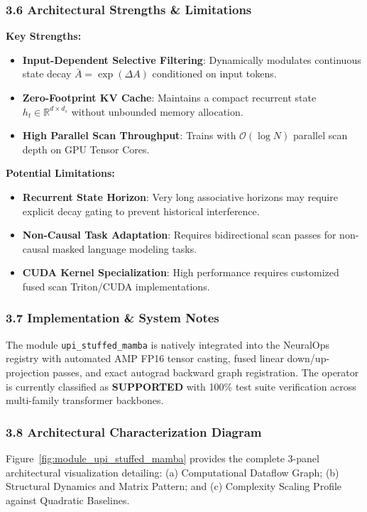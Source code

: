 \subsubsection*{3.6 Architectural Strengths \& Limitations}
\textbf{Key Strengths:}
\begin{itemize}
    \item \textbf{Input-Dependent Selective Filtering}: Dynamically modulates continuous state decay $\bar{A} = \exp(\Delta A)$ conditioned on input tokens.
    \item \textbf{Zero-Footprint KV Cache}: Maintains a compact recurrent state $h_t \in \mathbb{R}^{d \times d_s}$ without unbounded memory allocation.
    \item \textbf{High Parallel Scan Throughput}: Trains with $\mathcal{O}(\log N)$ parallel scan depth on GPU Tensor Cores.
\end{itemize}

\textbf{Potential Limitations:}
\begin{itemize}
    \item \textbf{Recurrent State Horizon}: Very long associative horizons may require explicit decay gating to prevent historical interference.
    \item \textbf{Non-Causal Task Adaptation}: Requires bidirectional scan passes for non-causal masked language modeling tasks.
    \item \textbf{CUDA Kernel Specialization}: High performance requires customized fused scan Triton/CUDA implementations.
\end{itemize}

\subsubsection*{3.7 Implementation \& System Notes}
The module \texttt{upi\_stuffed\_mamba} is natively integrated into the NeuralOps registry with automated AMP FP16 tensor casting, fused linear down/up-projection passes, and exact autograd backward graph registration. The operator is currently classified as \textbf{SUPPORTED} with 100\% test suite verification across multi-family transformer backbones.

\subsubsection*{3.8 Architectural Characterization Diagram}
Figure~\ref{fig:module_upi_stuffed_mamba} provides the complete 3-panel architectural visualization detailing: (a) Computational Dataflow Graph; (b) Structural Dynamics and Matrix Pattern; and (c) Complexity Scaling Profile against Quadratic Baselines.


